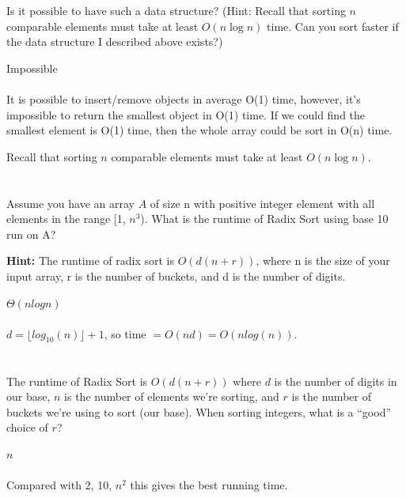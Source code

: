 \documentclass [12pt]{article}
\begin{document}
Is it possible to have such a data structure? (Hint: Recall that sorting $n$ comparable elements must take at least $O(n \log n)$ time. Can you sort faster if the data structure I described above exists?)

\begin{Solution}
Impossible
\paragraph{} 
It is possible to insert/remove objects in average O(1) time, however, it's impossible to return the smallest object in O(1) time. If we could find the smallest element is O(1) time, then the whole array could be sort in O(n) time.

Recall that sorting $n$ comparable elements must take at least $O(n \log n)$.
\end{Solution}


\section{} Assume you have an array $A$ of size n with positive integer element with all elements in the range [1, $n^3$).  What is the runtime of Radix Sort using base 10 run on A? 

\textbf{Hint:} The runtime of radix sort is $O(d (n+r))$, where n is the size of your input array, r is the number of buckets, and d is the number of digits.

\begin{Solution}
$\Theta(nlogn)$
\paragraph{} 
$d = \lfloor log_10(n) \rfloor + 1$, so time $= O(nd) = O(n log (n))$.

\end{Solution}


\section{} The runtime of Radix Sort is $O(d(n+r))$ where $d$ is the number of digits in our base, $n$ is the number of elements we're sorting, and $r$ is the number of buckets we're using to sort (our base). When sorting integers, what is a ``good'' choice of $r$?

\begin{Solution}
$n$
\paragraph{}
Compared with 2, 10, $n^2$ this gives the best running time.

\end{Solution}
\end{document}
